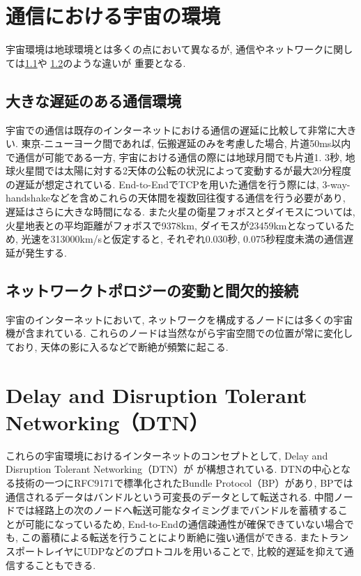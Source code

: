 \section{通信における宇宙の環境}
\label{section:通信における宇宙の環境}
宇宙環境は地球環境とは多くの点において異なるが, 
通信やネットワークに関しては\ref{section:大きな遅延のある通信環境}や
\ref{section:ネットワークトポロジーの変動と間欠的接続}のような違いが
重要となる. 


\subsection{大きな遅延のある通信環境}
\label{section:大きな遅延のある通信環境}
宇宙での通信は既存のインターネットにおける通信の遅延に比較して非常に大きい. 
東京-ニューヨーク間であれば, 伝搬遅延のみを考慮した場合, 片道50ms以内で通信が可能である一方, 宇宙における通信の際には地球月間でも片道1. 3秒, 
地球火星間では太陽に対する2天体の公転の状況によって変動するが最大20分程度の遅延が想定されている. 
End-to-EndでTCPを用いた通信を行う際には,  3-way-handshakeなどを含めこれらの天体間を複数回往復する通信を行う必要があり,  
遅延はさらに大きな時間になる.  
\cite{McBrayer2022}
また火星の衛星フォボスとダイモスについては, 
火星地表との平均距離がフォボスで9378km, ダイモスが23459kmとなっているため, 
光速を313000km/sと仮定すると, それぞれ0.030秒, 0.075秒程度未満の通信遅延が発生する. 


\subsection{ネットワークトポロジーの変動と間欠的接続}
\label{section:ネットワークトポロジーの変動と間欠的接続}
宇宙のインターネットにおいて, ネットワークを構成するノードには多くの宇宙機が含まれている. 
これらのノードは当然ながら宇宙空間での位置が常に変化しており, 
 天体の影に入るなどで断絶が頻繁に起こる.  

\section{Delay and Disruption Tolerant Networking（DTN）}
これらの宇宙環境におけるインターネットのコンセプトとして, Delay and Disruption Tolerant Networking（DTN）が
が構想されている. DTNの中心となる技術の一つにRFC9171\cite{rfc9171}で標準化されたBundle Protocol（BP）があり,  
BPでは通信されるデータはバンドルという可変長のデータとして転送される.  
中間ノードでは経路上の次のノードへ転送可能なタイミングまでバンドルを蓄積することが可能になっているため,  
End-to-Endの通信疎通性が確保できていない場合でも,  この蓄積による転送を行うことにより断絶に強い通信ができる. 
またトランスポートレイヤにUDPなどのプロトコルを用いることで,  比較的遅延を抑えて通信することもできる. \cite{bundle_protocol_architecture}

